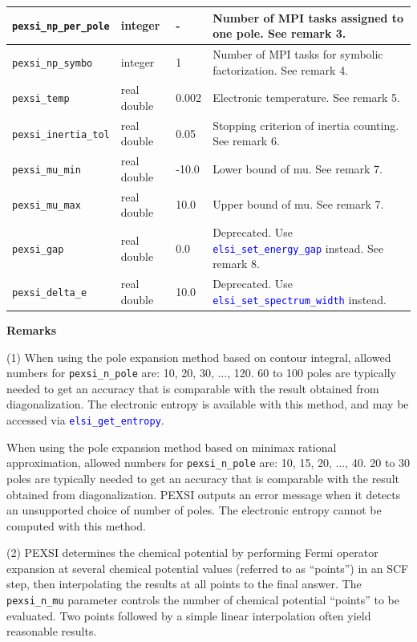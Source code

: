 \documentclass{report}
\newcommand{\api}[1]{\textcolor{blue}{\texttt{#1}}}
\begin{document}
\begin{tabular}[]{|p{30mm}|p{20mm}|p{15mm}|p{97mm}|}
\hline
\texttt{pexsi\_np\_per\_pole} & integer     & -     & Number of MPI tasks assigned to one pole. See remark 3.\\
\hline
\texttt{pexsi\_np\_symbo}     & integer     & 1     & Number of MPI tasks for symbolic factorization. See remark 4.\\
\hline
\texttt{pexsi\_temp}          & real double & 0.002 & Electronic temperature. See remark 5.\\
\hline
\texttt{pexsi\_inertia\_tol}  & real double & 0.05  & Stopping criterion of inertia counting. See remark 6.\\
\hline
\texttt{pexsi\_mu\_min}       & real double & -10.0 & Lower bound of mu. See remark 7.\\
\hline
\texttt{pexsi\_mu\_max}       & real double & 10.0  & Upper bound of mu. See remark 7.\\
\hline
\texttt{pexsi\_gap}           & real double & 0.0   & Deprecated. Use \api{elsi\_set\_energy\_gap} instead. See remark 8.\\
\hline
\texttt{pexsi\_delta\_e}      & real double & 10.0  & Deprecated. Use \api{elsi\_set\_spectrum\_width} instead.\\
\hline
\end{tabular}

\textbf{Remarks}

(1) When using the pole expansion method based on contour integral, allowed numbers for \texttt{pexsi\_n\_pole} are: 10, 20, 30, ..., 120. 60 to 100 poles are typically needed to get an accuracy that is comparable with the result obtained from diagonalization. The electronic entropy is available with this method, and may be accessed via \api{elsi\_get\_entropy}.

When using the pole expansion method based on minimax rational approximation, allowed numbers for \texttt{pexsi\_n\_pole} are: 10, 15, 20, ..., 40. 20 to 30 poles are typically needed to get an accuracy that is comparable with the result obtained from diagonalization. PEXSI outputs an error message when it detects an unsupported choice of number of poles. The electronic entropy cannot be computed with this method.

(2) PEXSI determines the chemical potential by performing Fermi operator expansion at several chemical potential values (referred to as ``points'') in an SCF step, then interpolating the results at all points to the final answer. The \texttt{pexsi\_n\_mu} parameter controls the number of chemical potential ``points'' to be evaluated. Two points followed by a simple linear interpolation often yield reasonable results.
\end{document}
